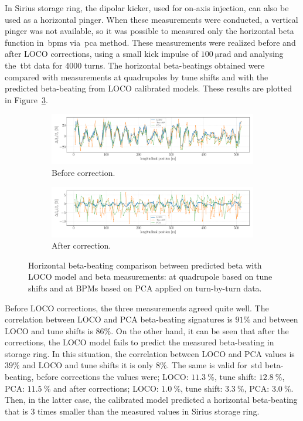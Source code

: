 In Sirius storage ring, the dipolar kicker, used for on-axis injection, can also be used as a horizontal pinger. When these measurements were conducted, a vertical pinger was not available, so it was possible to measured only the horizontal beta function in~\glspl{bpm} via~\gls{pca} method. These measurements were realized before and after LOCO corrections, using a small kick impulse of $\SI{100}{\micro\radian}$ and analysing the~\gls{tbt} data for 4000 turns. The horizontal beta-beatings obtained were compared with measurements at quadrupoles by tune shifts and with the predicted beta-beating from LOCO calibrated models. These results are plotted in Figure~\ref{fig:betax_compare}.
\begin{figure}
\centering
\begin{subfigure}[t]{1.0\textwidth}
\includegraphics[width=1.0\textwidth]{figures/betax_compare_loco_pca_quad_before_corr.pdf}
    \caption{Before correction.}
    \label{subfig:betax_compare_before}
\end{subfigure}
 \begin{subfigure}[t]{1.0\textwidth}
\includegraphics[width=1.0\textwidth]{figures/betax_compare_loco_pca_quad_after_corr.pdf}
    \caption{After correction.}
    \label{subfig:betax_compare_after}
\end{subfigure}
\caption{Horizontal beta-beating comparison between predicted beta with LOCO model and beta measurements: at quadrupole based on tune shifts and at BPMs based on PCA applied on turn-by-turn data.}
\label{fig:betax_compare}
\end{figure}

Before LOCO corrections, the three measurements agreed quite well. The correlation between LOCO and PCA beta-beating signatures is $91\%$ and between LOCO and tune shifts is $86\%$. On the other hand, it can be seen that after the corrections, the LOCO model fails to predict the measured beta-beating in storage ring. In this situation, the correlation between LOCO and PCA values is $39\%$ and LOCO and tune shifts it is only $8\%$. The same is valid for~\gls{std} beta-beating, before corrections the values were; LOCO: $\SI{11.3}{\%}$, tune shift: $\SI{12.8}{\%}$, PCA: $\SI{11.5}{\%}$ and after corrections; LOCO: $\SI{1.0}{\%}$, tune shift: $\SI{3.3}{\%}$, PCA: $\SI{3.0}{\%}$. Then, in the latter case, the calibrated model predicted a horizontal beta-beating that is 3 times smaller than the measured values in Sirius storage ring.

